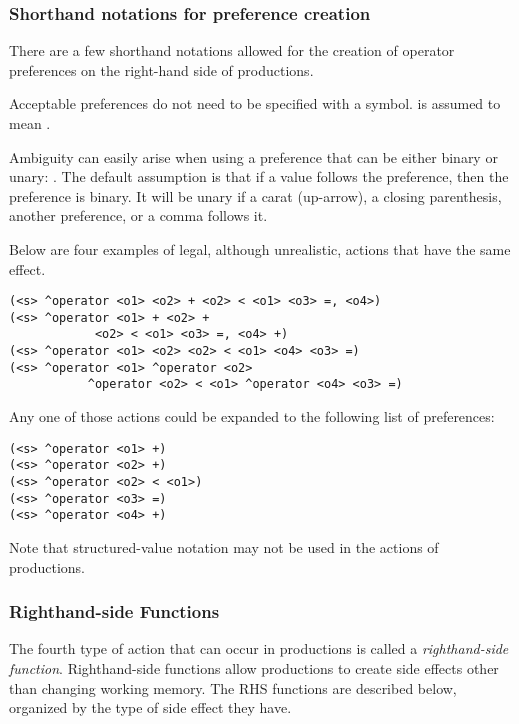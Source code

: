 \subsubsection{Shorthand notations for preference creation}

There are a few shorthand notations allowed for the creation of operator
preferences on the right-hand side of productions.

Acceptable preferences do not need to be specified with a \soar{+}
symbol.  is assumed to mean .

Ambiguity can easily arise when using a preference that can be
either binary or unary: \soar{> < =}. The default assumption is that if a
value follows the preference, then the preference is binary. It will be unary
if a carat (up-arrow), a closing parenthesis, another preference, or a comma follows it. 

Below are four examples of legal, although unrealistic, actions that have the
same effect.

\begin{verbatim}
(<s> ^operator <o1> <o2> + <o2> < <o1> <o3> =, <o4>)
(<s> ^operator <o1> + <o2> + 
            <o2> < <o1> <o3> =, <o4> +)
(<s> ^operator <o1> <o2> <o2> < <o1> <o4> <o3> =)
(<s> ^operator <o1> ^operator <o2>
           ^operator <o2> < <o1> ^operator <o4> <o3> =)
\end{verbatim}

Any one of those actions could be expanded to the following list of
preferences: 
\begin{verbatim}
(<s> ^operator <o1> +)
(<s> ^operator <o2> +)
(<s> ^operator <o2> < <o1>)
(<s> ^operator <o3> =)
(<s> ^operator <o4> +)
\end{verbatim}

Note that structured-value notation may not be used in the actions of 
productions.

\subsubsection{Righthand-side Functions}

The fourth type of action that can occur in productions is called a 
\emph{righthand-side function}.  Righthand-side functions allow productions
to create side effects other than changing working memory.  The RHS functions
are described below, organized by the type of side effect they have.

